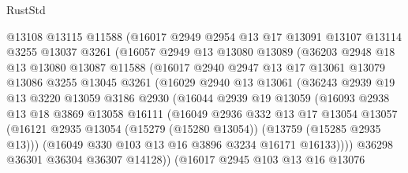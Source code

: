 \begin{lexlean}{RustStd}
\begin{coremodule}
              @13108
              @13115
              @11588
              (@16017
                @2949
                @2954
                @13
                @17
                @13091
                @13107
                @13114
                @3255
                @13037
                @3261
                (@16057
                  @2949
                  @13
                  @13080
                  @13089
                  (@36203
                    @2948
                    @18
                    @13
                    @13080
                    @13087
                    @11588
                    (@16017
                      @2940
                      @2947
                      @13
                      @17
                      @13061
                      @13079
                      @13086
                      @3255
                      @13045
                      @3261
                      (@16029
                        @2940
                        @13
                        @13061
                        (@36243
                          @2939
                          @19
                          @13
                          @3220
                          @13059
                          @3186
                          @2930
                          (@16044
                            @2939
                            @19
                            @13059
                            (@16093
                              @2938
                              @13
                              @18
                              @3869
                              @13058
                              @16111
                              (@16049
                                @2936
                                @332
                                @13
                                @17
                                @13054
                                @13057
                                (@16121
                                  @2935
                                  @13054
                                  (@15279 (@15280 @13054))
                                  (@13759 (@15285 @2935 @13)))
                                (@16049 @330 @103 @13 @16 @3896 @3234 @16171 @16133))))
                          @36298
                          @36301
                          @36304
                          @36307
                          @14128))
                      (@16017
                        @2945
                        @103
                        @13
                        @16
                        @13076

\end{coremodule}
\end{lexlean}
